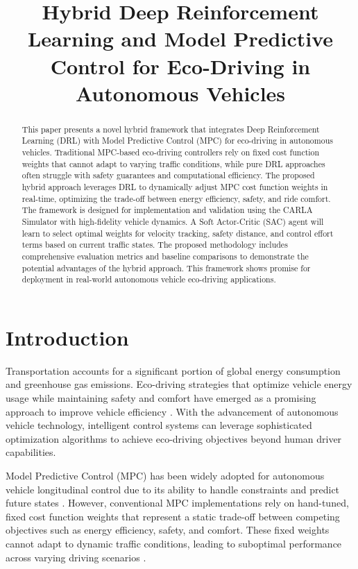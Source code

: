 \documentclass[conference,onecolumn,draftclsnofoot]{IEEEtran}
\begin{document}
\title{Hybrid Deep Reinforcement Learning and Model Predictive Control for Eco-Driving in Autonomous Vehicles}

\author{}

\maketitle

\begin{abstract}
This paper presents a novel hybrid framework that integrates Deep Reinforcement Learning (DRL) with Model Predictive Control (MPC) for eco-driving in autonomous vehicles. Traditional MPC-based eco-driving controllers rely on fixed cost function weights that cannot adapt to varying traffic conditions, while pure DRL approaches often struggle with safety guarantees and computational efficiency. The proposed hybrid approach leverages DRL to dynamically adjust MPC cost function weights in real-time, optimizing the trade-off between energy efficiency, safety, and ride comfort. The framework is designed for implementation and validation using the CARLA Simulator with high-fidelity vehicle dynamics. A Soft Actor-Critic (SAC) agent will learn to select optimal weights for velocity tracking, safety distance, and control effort terms based on current traffic states. The proposed methodology includes comprehensive evaluation metrics and baseline comparisons to demonstrate the potential advantages of the hybrid approach. This framework shows promise for deployment in real-world autonomous vehicle eco-driving applications.
\end{abstract}

\section{Introduction}

Transportation accounts for a significant portion of global energy consumption and greenhouse gas emissions. Eco-driving strategies that optimize vehicle energy usage while maintaining safety and comfort have emerged as a promising approach to improve vehicle efficiency \cite{b1, b9}. With the advancement of autonomous vehicle technology, intelligent control systems can leverage sophisticated optimization algorithms to achieve eco-driving objectives beyond human driver capabilities.

Model Predictive Control (MPC) has been widely adopted for autonomous vehicle longitudinal control due to its ability to handle constraints and predict future states \cite{b2, b11}. However, conventional MPC implementations rely on hand-tuned, fixed cost function weights that represent a static trade-off between competing objectives such as energy efficiency, safety, and comfort. These fixed weights cannot adapt to dynamic traffic conditions, leading to suboptimal performance across varying driving scenarios \cite{b12}.
\end{document}
